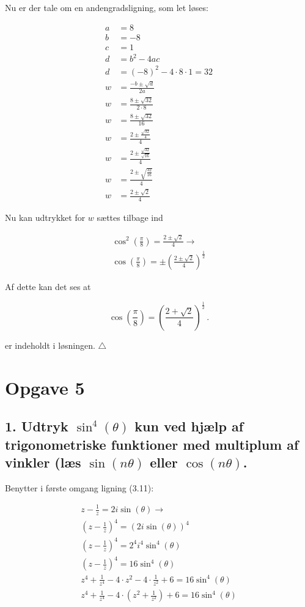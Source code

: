 \documentclass[a4paper, 12pt]{article}
\begin{document}
Nu er der tale om en andengradsligning, som let løses:

\begin{align*}
    a &= 8 \\
    b &= -8 \\
    c &= 1 \\
    d &= b^2 - 4 a c \\
    d &= (-8)^2 - 4 \cdot 8 \cdot 1 = 32 \\
    w &= \frac{ -b \pm \sqrt{d}}{2 a} \\
    w &= \frac{ 8 \pm \sqrt{32}}{2 \cdot 8} \\
    w &= \frac{ 8 \pm \sqrt{32}}{16} \\
    w &= \frac{ 2 \pm \frac{\sqrt{32}}{4}}{4} \\
    w &= \frac{ 2 \pm \frac{\sqrt{32}}{\sqrt{16}}}{4} \\
    w &= \frac{ 2 \pm \sqrt{\frac{32}{16}}}{4} \\
    w &= \frac{ 2 \pm \sqrt{2}}{4} 
\end{align*}

Nu kan udtrykket for \(w\) sættes tilbage ind

\begin{align*}
    \cos^2\left(\frac{\pi}{8}\right) = \frac{ 2 \pm \sqrt{2}}{4}   \to \\
    \cos\left(\frac{\pi}{8}\right) = \pm \left(\frac{ 2 \pm \sqrt{2}}{4}\right)^\frac{1}{2}
\end{align*}

Af dette kan det ses at 

$$\cos\left(\frac{\pi}{8}\right) = \left(\frac{2 + \sqrt{2}}{4}\right)^{\frac{1}{2}}\,.$$

er indeholdt i løsningen. \(\triangle\)


\section*{Opgave 5}
\label{sec:org8b0605e}

\subsection*{1. Udtryk \(\sin^4(\theta)\) kun ved hjælp af trigonometriske funktioner med multiplum af vinkler (læs \(\sin(n\theta)\) eller \(\cos(n\theta)\).}
\label{sec:org596cd01}

Benytter i første omgang ligning (3.11):

\begin{align*}
    z - \frac{1}{z} = 2 i \sin(\theta) \to \\
    \left(z - \frac{1}{z}\right)^4 = \left(2 i \sin(\theta)\right)^4  \\
    \left(z - \frac{1}{z}\right)^4 = 2^4 i^4 \sin^4(\theta)  \\
    \left(z - \frac{1}{z}\right)^4 = 16 \sin^4(\theta)  \\
    z^4 + \frac{1}{z^4} -4 \cdot z^2 - 4 \cdot \frac{1}{z^2} + 6 = 16 \sin^4(\theta)  \\
    z^4 + \frac{1}{z^4} -4 \cdot \left(z^2 + \frac{1}{z^2}\right) + 6 = 16 \sin^4(\theta)
\end{align*}
\end{document}
